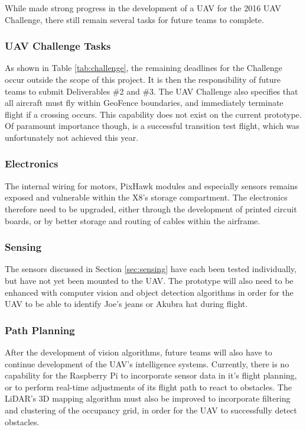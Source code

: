 While \ID made strong progress in the development of a UAV for the 2016 UAV Challenge, there still remain several tasks for future teams to complete.

\subsubsection*{UAV Challenge Tasks}
\label{sec:futurework}
As shown in Table \ref{tab:challenge}, the remaining deadlines for the Challenge occur outside the scope of this project. It is then the responsibility of future teams to submit Deliverables \#2 and \#3. The UAV Challenge also specifies that all aircraft must fly within GeoFence boundaries, and immediately terminate flight if a crossing occurs. This capability does not exist on the current prototype. Of paramount importance though, is a successful transition test flight, which was unfortunately not achieved this year.

\subsubsection*{Electronics}
The internal wiring for motors, PixHawk modules and especially sensors remains exposed and vulnerable within the X8's storage compartment. The electronics therefore need to be upgraded, either through the development of printed circuit boards, or by better storage and routing of cables within the airframe.

\subsubsection*{Sensing}
The sensors discussed in Section \ref{sec:sensing} have each been tested individually, but have not yet been mounted to the UAV. The prototype will also need to be enhanced with computer vision and object detection algorithms in order for the UAV to be able to identify Joe's jeans or Akubra hat during flight.

\subsubsection*{Path Planning}
After the development of vision algorithms, future teams will also have to continue development of the UAV's intelligence systems. Currently, there is no capability for the Raspberry Pi to incorporate sensor data in it's flight planning, or to perform real-time adjustments of its flight path to react to obstacles. The LiDAR's 3D mapping algorithm must also be improved to incorporate filtering and clustering of the occupancy grid, in order for the UAV to successfully detect obstacles.